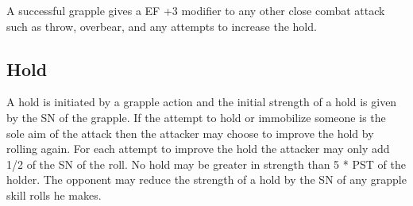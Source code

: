 A successful grapple gives a EF +3 modifier to any other close combat 
attack such as throw, overbear, and any attempts to increase the hold.

\subsection{Hold}

A hold is initiated by a grapple action and the initial strength of a
hold is given by the SN of the grapple. If the attempt to hold or 
immobilize someone is the sole aim of the attack then the attacker 
may choose to improve the hold by rolling again. For each attempt to 
improve the hold the attacker may only add 1/2 of the SN of the roll. 
No hold may be greater in strength than 5 * PST of the holder.
The opponent may reduce the strength of a hold by the SN of any 
grapple skill rolls he makes.

